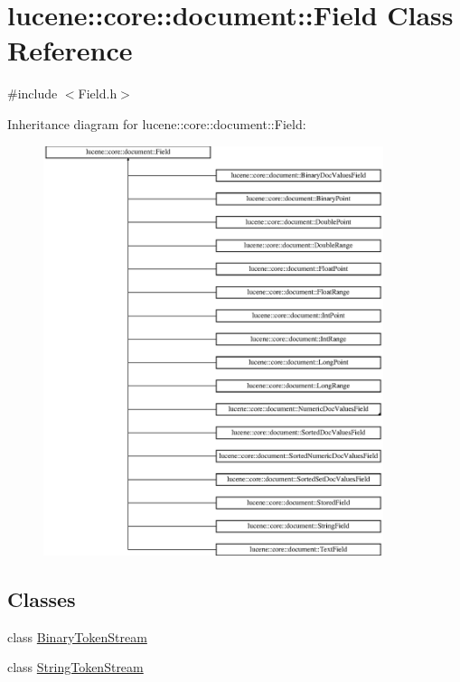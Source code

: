 \hypertarget{classlucene_1_1core_1_1document_1_1Field}{}\section{lucene\+:\+:core\+:\+:document\+:\+:Field Class Reference}
\label{classlucene_1_1core_1_1document_1_1Field}


{\ttfamily \#include $<$Field.\+h$>$}

Inheritance diagram for lucene\+:\+:core\+:\+:document\+:\+:Field\+:\begin{figure}[H]
\begin{center}
\leavevmode
\includegraphics[height=12.000000cm]{classlucene_1_1core_1_1document_1_1Field}
\end{center}
\end{figure}
\subsection*{Classes}
\begin{DoxyCompactItemize}
\item 
class \mbox{\hyperlink{classlucene_1_1core_1_1document_1_1Field_1_1BinaryTokenStream}{Binary\+Token\+Stream}}
\item 
class \mbox{\hyperlink{classlucene_1_1core_1_1document_1_1Field_1_1StringTokenStream}{String\+Token\+Stream}}
\end{DoxyCompactItemize}
